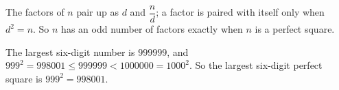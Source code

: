 The factors of $n$ pair up as $d$ and $\dfrac{n}{d}$; a factor is paired with itself only when $d^2=n$. So $n$ has an odd number of factors exactly when $n$ is a perfect square.

The largest six-digit number is $999999$, and $999^2=998001\le999999<1000000=1000^2$. So the largest six-digit perfect square is $999^2=\boxed{998001}$.
